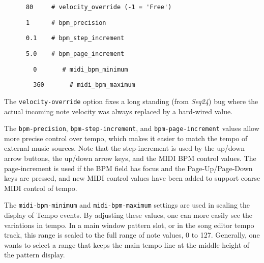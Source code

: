    \begin{verbatim}
      80     # velocity_override (-1 = 'Free')
   \end{verbatim}

   \begin{verbatim}
      1      # bpm_precision
   \end{verbatim}

   \begin{verbatim}
      0.1    # bpm_step_increment
   \end{verbatim}

   \begin{verbatim}
      5.0    # bpm_page_increment
   \end{verbatim}

   \begin{verbatim}
		0       # midi_bpm_minimum
   \end{verbatim}

   \begin{verbatim}
		360       # midi_bpm_maximum
   \end{verbatim}

      The \texttt{velocity-override} option fixes a long standing (from
      \textsl{Seq24}) bug where the actual incoming note velocity was always
      replaced by a hard-wired value.

      The \texttt{bpm-precision}, \texttt{bpm-step-increment}, and
      \texttt{bpm-page-increment} values allow more precise control over tempo,
      which makes it easier to match the tempo of external music sources.  Note
      that the step-increment is used by the up/down arrow buttons, the up/down
      arrow keys, and the MIDI BPM control values.  The page-increment is used
      if the BPM field has focus and the Page-Up/Page-Down keys are pressed,
      and new MIDI control values have been added to support coarse MIDI
      control of tempo.

		The \texttt{midi-bpm-minimum} and \texttt{midi-bpm-maximum} settings
		are used in scaling the display of Tempo events.
      By adjusting these values, one can more easily see the variations in
      tempo.  In a main window pattern slot, or in the song editor tempo track,
      this range is scaled to the full range of note values, 0 to 127.
      Generally, one wants to select a range that keeps the main tempo line at
      the middle height of the pattern display.

